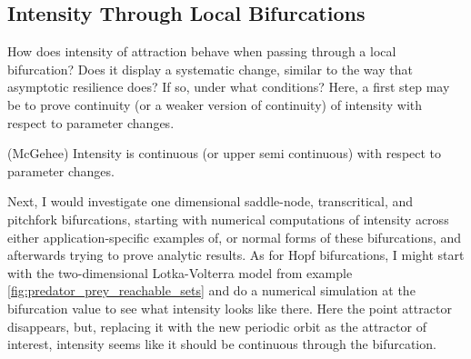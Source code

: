 
\subsection{Intensity Through Local Bifurcations}

How does intensity of attraction behave when passing through a local bifurcation? Does it display a systematic change, similar to the way that asymptotic resilience does? If so, under what conditions? 
%
Here, a first step may be to prove continuity (or a weaker version of continuity) of intensity with respect to parameter changes. 

\begin{conjecture}(McGehee)
	Intensity is continuous (or upper semi continuous) with respect to parameter changes. %
\end{conjecture}

Next, I would investigate one dimensional saddle-node, transcritical, and pitchfork bifurcations, starting with numerical computations of intensity across either application-specific examples of, or normal forms of these bifurcations, and afterwards trying to prove analytic results. 
%
%
%
%
As for Hopf bifurcations, I might start with the two-dimensional Lotka-Volterra model from example \ref{fig:predator_prey_reachable_sets} and do a numerical simulation at the bifurcation value to see what intensity looks like there. Here the point attractor disappears, but, replacing it with the new periodic orbit as the attractor of interest, intensity seems like it should be continuous through the bifurcation.  %

